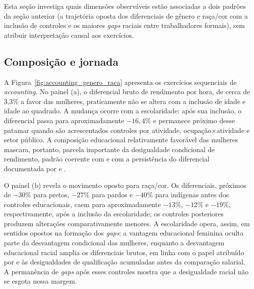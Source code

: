 \documentclass[12pt,a4paper]{article}
\begin{document}
Esta seção investiga quais dimensões observáveis estão associadas a dois padrões
da seção anterior (a trajetória oposta dos diferenciais de gênero e raça/cor com
a inclusão de controles e os maiores \textit{gaps} raciais entre trabalhadores
formais), sem atribuir interpretação causal aos exercícios.

\subsection{Composição e jornada}
\label{subsec:composicao_jornada}

A Figura~\ref{fig:accounting_genero_raca} apresenta os exercícios sequenciais de
\textit{accounting}. No painel (a), o diferencial bruto de rendimento por hora,
de cerca de 3,3\% a favor das mulheres, praticamente não se altera com a
inclusão de idade e idade ao quadrado. A mudança ocorre com a escolaridade: após
sua inclusão, o diferencial passa para aproximadamente $-16,4\%$ e permanece
próximo desse patamar quando são acrescentados controles por atividade,
ocupação$\times$atividade e setor público. A composição educacional relativamente
favorável das mulheres mascara, portanto, parcela importante da desigualdade
condicional de rendimento, padrão coerente com \citet{giuberti2005} e com a
persistência do diferencial documentada por \citet{madalozzo2010} e
\citet{morello2021}.

O painel (b) revela o movimento oposto para raça/cor. Os diferenciais,
próximos de $-30\%$ para pretos, $-27\%$ para pardos e $-40\%$ para indígenas
antes dos controles educacionais, caem para aproximadamente $-13\%$, $-12\%$ e
$-19\%$, respectivamente, após a inclusão da escolaridade; os controles
posteriores produzem alterações comparativamente menores. A escolaridade opera,
assim, em sentidos opostos na formação dos \textit{gaps}: a vantagem educacional
feminina oculta parte da desvantagem condicional das mulheres, enquanto a
desvantagem educacional racial amplia os diferenciais brutos, em linha com o
papel atribuído por \citet{soares2000} e \citet{campante2004} às desigualdades
de qualificação acumuladas antes da comparação salarial. A permanência de
\textit{gaps} após esses controles mostra que a desigualdade racial não se esgota
nessa margem.
\end{document}
